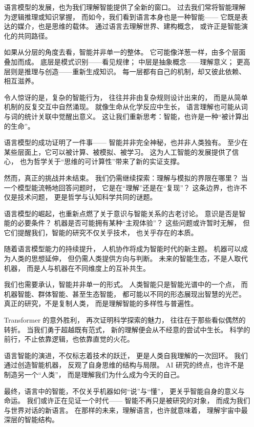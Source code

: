 语言模型的发展，也为我们理解智能提供了全新的窗口。  
过去我们常将智能理解为逻辑推理或知识掌握，  
而如今，我们看到语言本身也是一种智能——  
它既是表达的媒介，也是思维的载体。  
通过语言去理解世界、建构概念，  
或许正是智能演化的共同路径。  

如果从分层的角度去看，智能并非单一的整体。  
它可能像洋葱一样，由多个层面叠加而成。  
底层是模式识别——看见规律；  
中层是抽象概念——理解意义；  
更高层则是推理与创造——重新生成知识。  
每一层都有自己的机制，却又彼此依赖、相互滋养。  

令人惊讶的是，复杂的智能行为，  
往往并非由复杂规则设计出来的，  
而是从简单机制的反复交互中自然涌现。  
就像生命从化学反应中生长，  
语言理解也可能从词与词的统计关联中觉醒出意义。  
这让我们重新思考：智能，也许是一种“被计算出的生命”。  

语言模型的成功证明了一件事——  
智能并非完全神秘，也并非人类独有。  
至少在某些层面上，它可以被计算、被模拟、被学习。  
这为人工智能的发展提供了信心，  
也为哲学关于“思维的可计算性”带来了新的实证支撑。  

然而，真正的挑战并未结束。  
我们仍需继续探索：理解与模拟的界限在哪里？  
当一个模型能流畅地回答问题时，  
它是在“理解”还是在“复现”？  
这条边界，也许不仅是技术问题，  
更是哲学与认知科学共同的谜题。  

语言模型的崛起，也重新点燃了关于意识与智能关系的古老讨论。  
意识是否是智能的必要条件？  
机器是否可能拥有某种“主观体验”？  
这些问题或许暂时无解，  
但它们提醒我们，智能的研究不仅关乎技术，  
也关乎存在的本质。  

随着语言模型能力的持续提升，  
人机协作将成为智能时代的新主题。  
机器可以成为人类的思想延伸，  
但仍需人类提供方向与判断。  
未来的智能生态，不是人取代机器，  
而是人与机器在不同维度上的互补共生。  

我们也需要承认，智能并非单一的形式。  
人类智能只是智能光谱中的一个点，  
而机器智能、群体智能、甚至生态智能，  
都可能以不同的形态展现出智慧的光芒。  
真正的研究，不是复制人类，  
而是理解智能的多样性与普遍性。  

Transformer 的意外胜利，  
再次证明科学探索的魅力，  
往往在于那些看似偶然的转折。  
当我们勇于超越既有范式，  
新的理解便会从不经意的尝试中生长。  
科学的前行，不止依靠逻辑，也依靠直觉的火花。  

语言智能的演进，不仅标志着技术的跃迁，  
更是人类自我理解的一次回环。  
我们通过创造智能机器，  
反观了自身思维的结构与局限。  
AI 研究的终点，也许不是制造另一个“人类”，  
而是理解我们为什么成为今天的自己。  

最终，语言中的智能，不仅关乎机器如何“说”与“懂”，  
更关乎智能自身的意义与命运。  
我们或许正在见证一个时代——  
智能不再只是被研究的对象，  
而成为我们与世界对话的新语言。  
在那样的未来，理解语言，也许就意味着，  
理解宇宙中最深层的智能结构。  

